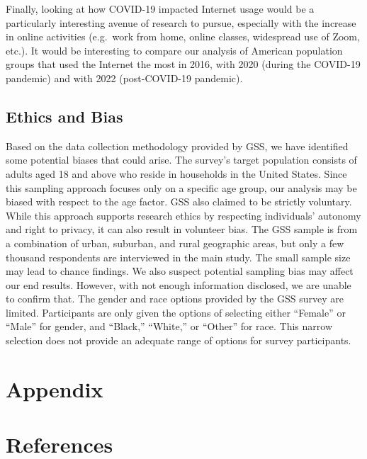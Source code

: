\documentclass[
]{article}
\begin{document}
Finally, looking at how COVID-19 impacted Internet usage would be a
particularly interesting avenue of research to pursue, especially with
the increase in online activities (e.g.~work from home, online classes,
widespread use of Zoom, etc.). It would be interesting to compare our
analysis of American population groups that used the Internet the most
in 2016, with 2020 (during the COVID-19 pandemic) and with 2022
(post-COVID-19 pandemic).

\hypertarget{sec-bias}{%
\subsection{Ethics and Bias}\label{sec-bias}}

Based on the data collection methodology provided by GSS, we have
identified some potential biases that could arise. The survey's target
population consists of adults aged 18 and above who reside in households
in the United States. Since this sampling approach focuses only on a
specific age group, our analysis may be biased with respect to the age
factor. GSS also claimed to be strictly voluntary. While this approach
supports research ethics by respecting individuals' autonomy and right
to privacy, it can also result in volunteer bias. The GSS sample is from
a combination of urban, suburban, and rural geographic areas, but only a
few thousand respondents are interviewed in the main study. The small
sample size may lead to chance findings. We also suspect potential
sampling bias may affect our end results. However, with not enough
information disclosed, we are unable to confirm that. The gender and
race options provided by the GSS survey are limited. Participants are
only given the options of selecting either ``Female'' or ``Male'' for
gender, and ``Black,'' ``White,'' or ``Other'' for race. This narrow
selection does not provide an adequate range of options for survey
participants.

\hypertarget{appendix}{%
\section{Appendix}\label{appendix}}

\hypertarget{references}{%
\section*{References}\label{references}}
\end{document}
